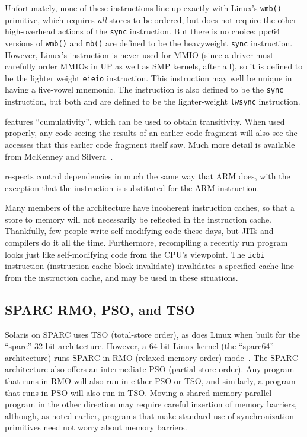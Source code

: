 Unfortunately, none of these instructions line up exactly with Linux's
{\tt wmb()} primitive, which requires {\em all} stores to be ordered,
but does not require the other high-overhead actions of the {\tt sync}
instruction.
But there is no choice: ppc64 versions of {\tt wmb()} and {\tt mb()} are
defined to be the heavyweight {\tt sync} instruction.
However, Linux's  instruction is never used for MMIO
(since a driver must carefully order MMIOs in UP as well as
SMP kernels, after all), so it is defined to be the lighter weight
{\tt eieio} instruction.
This instruction may well be unique in having a five-vowel mnemonic.
The  instruction is also defined to be the {\tt sync}
instruction, but both  and  are defined to
be the lighter-weight {\tt lwsync} instruction.

\Power{} features ``cumulativity'', which can be used to obtain
transitivity.
When used properly, any code seeing the results of an earlier
code fragment will also see the accesses that this earlier code
fragment itself saw.
Much more detail is available from
McKenney and Silvera~\cite{PaulEMcKenneyN2745r2009}.

\Power{} respects control dependencies in much the same way that ARM
does, with the exception that the \Power{}  instruction
is substituted for the ARM  instruction.

Many members of the \Power{} architecture have incoherent instruction
caches, so that a store to memory will not necessarily be reflected
in the instruction cache.
Thankfully, few people write self-modifying code these days, but JITs
and compilers do it all the time.
Furthermore, recompiling a recently run program looks just like
self-modifying code from the CPU's viewpoint.
The {\tt icbi} instruction (instruction cache block invalidate)
invalidates a specified cache line from
the instruction cache, and may be used in these situations.

\subsection{SPARC RMO, PSO, and TSO}

Solaris on SPARC uses TSO (total-store order), as does Linux when built for
the ``sparc'' 32-bit architecture.
However, a 64-bit Linux kernel (the ``sparc64'' architecture)
runs SPARC in RMO (relaxed-memory order) mode~\cite{SPARC94}.
The SPARC architecture also offers an intermediate PSO (partial store
order).
Any program that runs in RMO will also run in either PSO or TSO, and similarly,
a program that runs in PSO will also run in TSO.
Moving a shared-memory parallel program in the other direction may
require careful insertion of memory barriers, although, as noted earlier,
programs that make standard use of synchronization primitives need not
worry about memory barriers.


